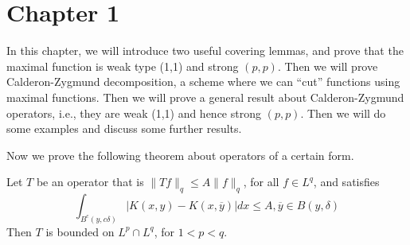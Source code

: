 \chapter{Chapter 1}
In this chapter, we will introduce two useful covering lemmas, and prove that the maximal function is weak type (1,1) and strong $(p,p)$. Then we will prove Calderon-Zygmund decomposition, a scheme where we can ``cut'' functions using maximal functions. Then we will prove a general result about Calderon-Zygmund operators, i.e., they are weak (1,1) and hence strong $(p,p)$. Then we will do some examples and discuss some further results.



Now we prove the following theorem about operators of a certain form.
\begin{thm}
    Let $T$ be an operator that is $\|Tf\|_q\leq A\|f\|_q$, for all $f\in L^q$, and satisfies 
    \begin{equation*}
        \int_{B^c(y,c\delta)}|K(x,y)-K(x,\overline{y})|dx\leq A, \overline{y}\in B(y,\delta)
    \end{equation*}
    Then $T$ is bounded on $L^p\cap L^q$, for $1<p<q$.
\end{thm}



